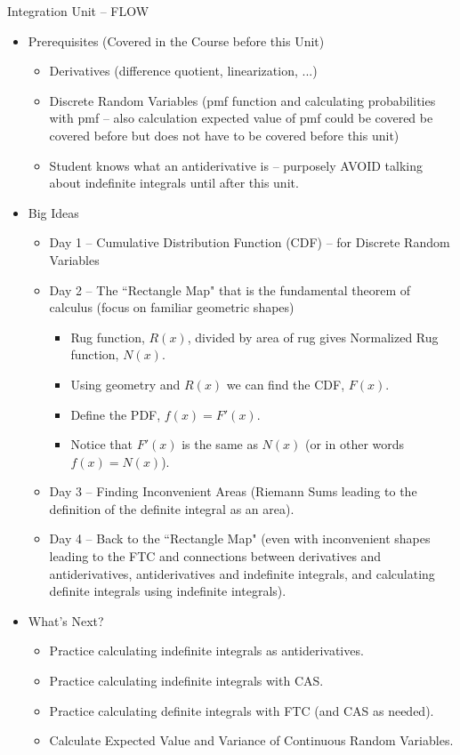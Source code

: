 \documentclass[letterpaper,oneside]{book}%
\theoremstyle{plain}
\theoremstyle{box}
\theoremstyle{problem}
\begin{document}
Integration Unit -- FLOW
\begin{itemize}
\item Prerequisites (Covered in the Course before this Unit)
\begin{itemize}
\item Derivatives (difference quotient, linearization, ...)
\item Discrete Random Variables (pmf function and calculating probabilities with pmf -- also calculation expected value of pmf could be covered be covered before but does not have to be covered before this unit)
\item Student knows what an antiderivative is -- purposely AVOID talking about indefinite integrals until after this unit.
\end{itemize}
\item Big Ideas
\begin{itemize}
\item Day 1 -- Cumulative Distribution Function (CDF) -- for Discrete Random Variables
\item Day 2 -- The ``Rectangle Map" that is the fundamental theorem of calculus (focus on familiar geometric shapes) 
\begin{itemize}
\item Rug function, $R(x)$, divided by area of rug gives Normalized Rug function, $N(x)$.
\item Using geometry and $R(x)$ we can find the CDF, $F(x)$.
\item Define the PDF, $f(x) = F'(x)$.
\item Notice that $F'(x)$ is the same as $N(x)$ (or in other words $f(x) = N(x)$).
\end{itemize}
\item Day 3 -- Finding Inconvenient Areas (Riemann Sums leading to the definition of the definite integral as an area).
\item Day 4 -- Back to the ``Rectangle Map" (even with inconvenient shapes leading to the FTC and connections between derivatives and antiderivatives, antiderivatives and indefinite integrals, and calculating definite integrals using indefinite integrals).
\end{itemize}
\item What's Next?
\begin{itemize}
\item Practice calculating indefinite integrals as antiderivatives.
\item Practice calculating indefinite integrals with CAS.
\item Practice calculating definite integrals with FTC (and CAS as needed).
\item Calculate Expected Value and Variance of Continuous Random Variables.
\end{itemize}
\end{itemize}
\end{document}

